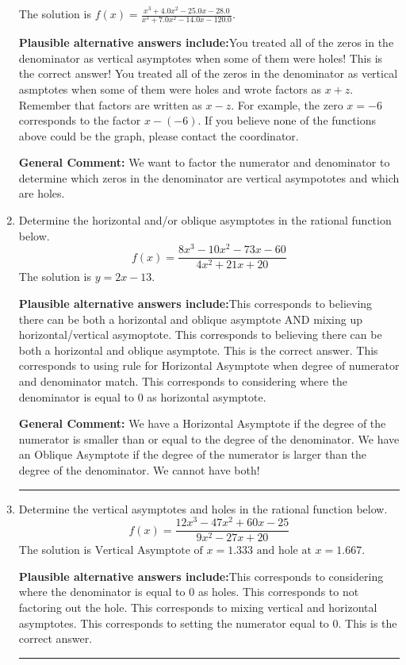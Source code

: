 \documentclass{extbook}[14pt]
\newcommand{\litem}[1]{\item #1

\rule{\textwidth}{0.4pt}}
\begin{document}
\begin{enumerate}
{The solution is \( f(x)=\frac{x^{3} +4.0 x^{2} -25.0 x -28.0}{x^{3} +7.0 x^{2} -14.0 x -120.0} \).\begin{enumerate}[label=\Alph*.]
\textbf{Plausible alternative answers include:}You treated all of the zeros in the denominator as vertical asymptotes when some of them were holes!
This is the correct answer!
You treated all of the zeros in the denominator as vertical asmptotes when some of them were holes and wrote factors as $x+z$.
Remember that factors are written as $x-z$. For example, the zero $x=-6$ corresponds to the factor $x-(-6)$.
If you believe none of the functions above could be the graph, please contact the coordinator.
\end{enumerate}

\textbf{General Comment:} We want to factor the numerator and denominator to determine which zeros in the denominator are vertical asympototes and which are holes.
}
\litem{
Determine the horizontal and/or oblique asymptotes in the rational function below.
\[ f(x) = \frac{8x^{3} -10 x^{2} -73 x -60}{4x^{2} +21 x + 20} \]The solution is \( y = 2x -13 \).\begin{enumerate}[label=\Alph*.]
\textbf{Plausible alternative answers include:}This corresponds to believing there can be both a horizontal and oblique asymptote AND mixing up horizontal/vertical asymoptote.
This corresponds to believing there can be both a horizontal and oblique asymptote.
This is the correct answer.
This corresponds to using rule for Horizontal Asymptote when degree of numerator and denominator match.
This corresponds to considering where the denominator is equal to 0 as horizontal asymptote.
\end{enumerate}

\textbf{General Comment:} We have a Horizontal Asymptote if the degree of the numerator is smaller than or equal to the degree of the denominator. We have an Oblique Asymptote if the degree of the numerator is larger than the degree of the denominator. We cannot have both!
}
\litem{
Determine the vertical asymptotes and holes in the rational function below.
\[ f(x) = \frac{12x^{3} -47 x^{2} +60 x -25}{9x^{2} -27 x + 20} \]The solution is \( \text{Vertical Asymptote of } x = 1.333 \text{ and hole at } x = 1.667 \).\begin{enumerate}[label=\Alph*.]
\textbf{Plausible alternative answers include:}This corresponds to considering where the denominator is equal to 0 as holes.
This corresponds to not factoring out the hole.
This corresponds to mixing vertical and horizontal asymptotes.
This corresponds to setting the numerator equal to 0.
This is the correct answer.
\end{enumerate}

}
\end{enumerate}
\end{document}
